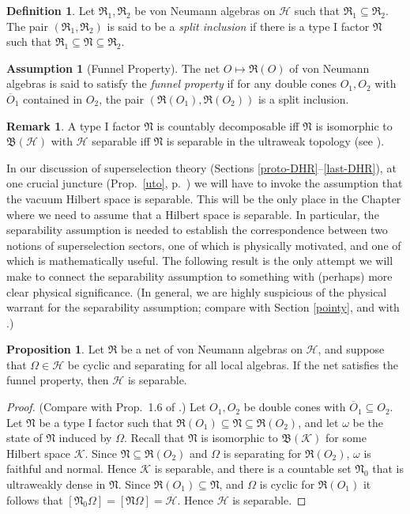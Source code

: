 \documentclass[12pt]{article}
\newcommand{\alg}[1]{\mathfrak{#1}}
\newcommand{\bh}{\mathfrak{B}(\mathcal{H})}
\theoremstyle{definition}
\newtheorem{assumption}{Assumption}
\newtheorem{prop}[thm]{Proposition}
\theoremstyle{definition}
\newtheorem{defn}[thm]{Definition}
\newtheorem{note}[thm]{Remark}
\theoremstyle{remark}
\def\2#1{{\mathcal #1}}
\def\ol#1{{\overline #1}}
\def\al#1{{\mathfrak #1}}
\def\om{\omega} \def\Om{\Omega} \def\dd{\partial} \def\D{\Delta}
\begin{document}
\begin{defn} Let $\al R_1,\al R_2$ be von Neumann
  algebras on $\2H$ such that $\al R_1\subseteq \al
  R_2$.  The pair $(\al R_1,\al R_2)$ is said to be a
  \emph{split inclusion} if there is a type I factor
  $\al N$ such that $\al R_1\subseteq \al N\subseteq
  \al R_2$.  \label{banana} \end{defn}

\begin{assumption}[Funnel Property] The net $O\mapsto
  \al R(O)$ of von Neumann algebras is said to satisfy
  the \emph{funnel property} if for any double cones
  $O_1,O_2$ with $\ol O_1$ contained in $O_2$, the pair
  $(\al R(O_1),\al R(O_2))$ is a split inclusion.
\end{assumption}

\begin{note} A type I factor $\alg{N}$ is countably decomposable iff
  $\alg{N}$ is isomorphic to $\bh$ with $\2H$ separable iff $\alg{N}$
  is separable in the ultraweak topology (see \cite[Exercise
  5.7.7]{kr}).
\end{note}

In our discussion of superselection theory (Sections
\ref{proto-DHR}--\ref{last-DHR}), at one crucial juncture (Prop.\
\ref{uto}, p.\ \pageref{uto}) we will have to invoke the assumption
that the vacuum Hilbert space is separable.  This will be the only
place in the Chapter where we need to assume that a Hilbert space is
separable.  In particular, the separability assumption is needed to
establish the correspondence between two notions of superselection
sectors, one of which is physically motivated, and one of which is
mathematically useful.  The following result is the only attempt we
will make to connect the separability assumption to something with
(perhaps) more clear physical significance.  (In general, we are
highly suspicious of the physical warrant for the separability
assumption; compare with Section \ref{pointy}, and with \cite{hans}.)

\begin{prop} Let $\alg{R}$ be a net of von Neumann algebras on $\2H$,
  and suppose that $\Om \in \2H$ be cyclic and separating for all
  local algebras.  If the net satisfies the funnel property, then
  $\2H$ is separable.  \label{separable}
\end{prop}

\begin{proof} (Compare with Prop.\ 1.6 of \cite{split}.) Let $O_1,O_2$
  be double cones with $\ol O_1\subseteq O_2$.  Let $\alg{N}$ be a
  type I factor such that $\alg{R}(O_1)\subseteq \alg{N}\subseteq
  \alg{R}(O_2)$, and let $\om$ be the state of $\alg{N}$ induced by
  $\Om$.  Recall that $\alg{N}$ is isomorphic to $\alg{B}(\2K )$ for
  some Hilbert space $\2K$.  Since $\alg{N}\subseteq \alg{R}(O_2)$ and
  $\Om$ is separating for $\alg{R}(O_2)$, $\om$ is faithful and
  normal.  Hence $\2K$ is separable, and there is a countable set
  $\alg{N}_0$ that is ultraweakly dense in $\alg{N}$.  Since
  $\alg{R}(O_1)\subseteq \alg{N}$, and $\Om$ is cyclic for
  $\alg{R}(O_1)$ it follows that $[\alg{N}_0\Om ]=[\alg{N}\Om ]=\2H$.
  Hence $\2H$ is separable.  \end{proof}
\end{document}
